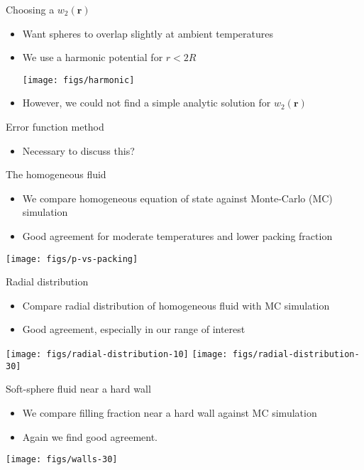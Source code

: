 \documentclass{beamer}
\newcommand{\rr}{\textbf{r}}
\begin{document}
\begin{frame}{Choosing a $w_2(\rr)$}
 \begin{itemize}
   \item Want spheres to overlap slightly at ambient temperatures
   \item We use a harmonic potential for $r < 2R$
     \begin{center}
       \texttt{[image: figs/harmonic]}
     \end{center}
   \item However, we could not find a simple analytic solution for $w_2(\rr)$
 \end{itemize}
\end{frame}

\begin{frame}{Error function method}
  \begin{itemize}
    \item Necessary to discuss this?
  \end{itemize}
\end{frame}

\begin{frame}{The homogeneous fluid}
  \begin{itemize}
    \item We compare homogeneous equation of state against Monte-Carlo
      (MC) simulation
    \item Good agreement for moderate temperatures and lower
      packing fraction
  \end{itemize}
  \begin{center}
    \texttt{[image: figs/p-vs-packing]}
  \end{center}
\end{frame}

\begin{frame}{Radial distribution}
  \begin{itemize}
    \item Compare radial distribution of homogeneous fluid with MC
      simulation
      \item Good agreement, especially in our range of interest
  \end{itemize}
  \begin{center}
    \texttt{[image: figs/radial-distribution-10]}
    \texttt{[image: figs/radial-distribution-30]}
  \end{center}
\end{frame}

\begin{frame}{Soft-sphere fluid near a hard wall}
  \begin{itemize}
    \item We compare filling fraction near a hard wall against MC simulation
    \item Again we find good agreement.
  \end{itemize}
  \begin{center}
    \texttt{[image: figs/walls-30]}
  \end{center}
\end{frame}
\end{document}
